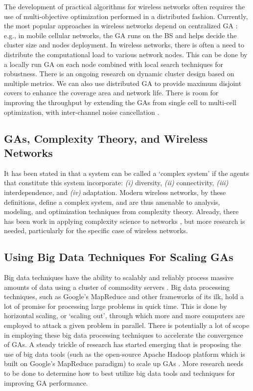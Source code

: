 \documentclass[journal]{IEEEtran}
\begin{document}
The development of practical algorithms for wireless networks often requires the use of multi-objective optimization performed in a distributed fashion. Currently, the most popular approaches in wireless networks depend on centralized GA \cite{lai2007effective}: e.g., in mobile cellular networks, the  GA runs on the BS and helps decide the cluster size and nodes deployment. In wireless networks, there is often a need to distribute the computational load to various network nodes. This can be done by a locally run GA on each node combined with local search techniques for robustness. There is an ongoing research on dynamic cluster design based on multiple metrics. We can also use distributed GA to provide maximum disjoint covers to enhance the coverage area and network life. There is room for improving the throughput by extending the GAs from single cell to multi-cell optimization, with inter-channel noise cancellation \cite{ayyadurai2011multihop}.



\subsection{GAs, Complexity Theory, and Wireless Networks}

It has been stated in \cite{page2010diversity} that a system can be called a `complex system' if the agents that constitute this system incorporate: \textit{(i)} diversity, \textit{(ii)} connectivity, \textit{(iii)} interdependence, and \textit{(iv)} adaptation. Modern wireless networks, by these definitions, define a complex system, and are thus amenable to analysis, modeling, and optimization techniques from complexity theory. Already, there has been work in applying complexity science to networks \cite{mitchell2006complex} \cite{strogatz2001exploring}, but more research is needed, particularly for the specific case of wireless networks.

\subsection{Using Big Data Techniques For Scaling GAs}

Big data techniques have the ability to scalably and reliably process massive amounts of data using a cluster of commodity servers \cite{qadir2014acmfit}. Big data processing techniques, such as Google's MapReduce and other frameworks of its ilk, hold a lot of promise for processing large problems in quick time. This is done by horizontal scaling, or  `scaling out', through which more and more computers are employed  to attack a given problem in parallel. There is potentially a lot of scope in employing these big data processing techniques to accelerate the convergence of GAs. A steady trickle of research has started emerging that is proposing the use of big data tools (such as the open-source Apache Hadoop platform which is built on Google's MapReduce paradigm) to scale up GAs \cite{verma2009scaling} \cite{llora2010huge}. More research needs to be done to determine how to best utilize big data tools and techniques for improving GA performance.
\end{document}

